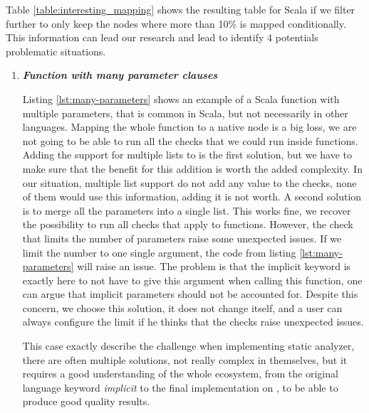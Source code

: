 Table \ref{table:interesting_mapping} shows the resulting table for Scala if we filter further to only keep the nodes where more than 10\% is mapped conditionally. 
This information can lead our research and lead to identify 4 potentials problematic situations.

\begin{enumerate}
	\item \textbf{\textit{Function with many parameter clauses}} \newline 
	
	
	Listing \ref{lst:many-parameters} shows an example of a Scala function with multiple parameters, that is common in Scala, but not necessarily in other languages. 
	Mapping the whole function to a native node is a big loss, we are not going to be able to run all the checks that we could run inside functions.
	Adding the support for multiple lists to \slang{} is the first solution, but we have to make sure that the benefit for this addition is worth the added complexity.
	In our situation, multiple list support do not add any value to the checks, none of them would use this information, adding it is not worth.
	A second solution is to merge all the parameters into a single list.
	This works fine, we recover the possibility to run all checks that apply to functions.
	However, the check that limits the number of parameters raise some unexpected issues.
	If we limit the number to one single argument, the code from listing \ref{lst:many-parameters} will raise an issue.
	The problem is that the implicit keyword is exactly here to not have to give this argument when calling this function, one can argue that implicit parameters should not be accounted for.
	Despite this concern, we choose this solution, it does not change \slang{} itself, and a user can always configure the limit if he thinks that the checks raise unexpected issues.
	
	This case exactly describe the challenge when implementing static analyzer, there are often multiple solutions, not really complex in themselves, but it requires a good understanding of the whole ecosystem, from the original language keyword \emph{implicit} to the final implementation on \slang{}, to be able to produce good quality results.
	

\end{enumerate}
